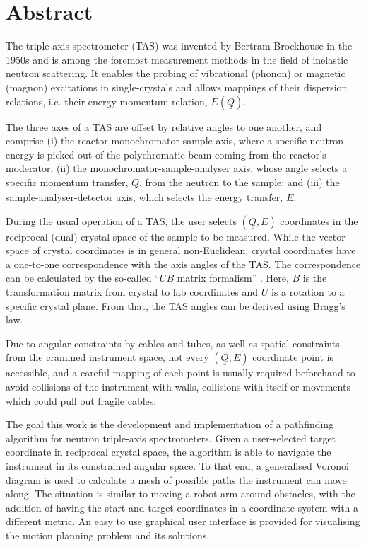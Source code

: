 %
%

\chapter*{Abstract}

The triple-axis spectrometer (TAS) \cite{Shirane2002} was invented by Bertram Brockhouse in the 1950s and
is among the foremost measurement methods in the field of inelastic neutron scattering. 
It enables the probing of vibrational (phonon) or magnetic (magnon) excitations in single-crystals and allows 
mappings of their dispersion relations, i.e. their energy-momentum relation, $E\left( \underline{Q} \right)$.

The three axes of a TAS are offset by relative angles to one another, and comprise 
(i) the reactor-monochromator-sample axis, where a specific neutron energy is picked out of the polychromatic 
beam coming from the reactor's moderator; 
(ii) the monochromator-sample-analyser axis, whose angle selects a specific momentum transfer, $\underline{Q}$, 
from the neutron to the sample; and 
(iii) the sample-analyser-detector axis, which selects the energy transfer, $E$.

During the usual operation of a TAS, the user selects $\left( \underline{Q}, E \right)$ coordinates
in the reciprocal (dual) crystal space of the sample to be measured. While the vector space of crystal coordinates
is in general non-Euclidean, crystal coordinates have a one-to-one correspondence with the axis angles 
of the TAS. The correspondence can be calculated by the so-called ``$UB$ matrix formalism'' \cite{Lumsden2005}. 
Here, $B$ is the transformation matrix from crystal to lab coordinates and $U$ is a rotation to a specific 
crystal plane. From that, the TAS angles can be derived using Bragg's law.

Due to angular constraints by cables and tubes, as well as spatial constraints from the crammed instrument space, 
not every $\left( \underline{Q}, E \right)$ coordinate point is accessible, and a careful mapping of each point is
usually required beforehand to avoid collisions of the instrument with walls, collisions with itself or movements
which could pull out fragile cables.

The goal this work is the development and implementation of a pathfinding algorithm for
neutron triple-axis spectrometers.
Given a user-selected target coordinate in reciprocal crystal space,
the algorithm is able to navigate the instrument in its constrained angular space.
To that end, a generalised Voronoi diagram is used to calculate a mesh of possible paths
the instrument can move along.
The situation is similar to moving a robot arm around obstacles, with the addition of having
the start and target coordinates in a coordinate system with a different metric.
An easy to use graphical user interface is provided for visualising the motion planning
problem and its solutions.
